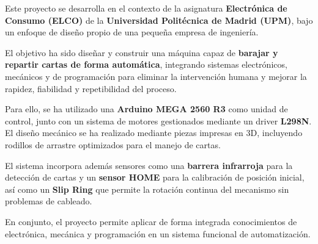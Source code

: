 Este proyecto se desarrolla en el contexto de la asignatura \textbf{Electrónica de Consumo (ELCO)} de la \textbf{Universidad Politécnica de Madrid (UPM)}, bajo un enfoque de diseño propio de una pequeña empresa de ingeniería.

El objetivo ha sido diseñar y construir una máquina capaz de \textbf{barajar y repartir cartas de forma automática}, integrando sistemas electrónicos, mecánicos y de programación para eliminar la intervención humana y mejorar la rapidez, fiabilidad y repetibilidad del proceso.

Para ello, se ha utilizado una \textbf{Arduino MEGA 2560 R3} como unidad de control, junto con un sistema de motores gestionados mediante un driver \textbf{L298N}. El diseño mecánico se ha realizado mediante piezas impresas en 3D, incluyendo rodillos de arrastre optimizados para el manejo de cartas.

El sistema incorpora además sensores como una \textbf{barrera infrarroja} para la detección de cartas y un \textbf{sensor HOME} para la calibración de posición inicial, así como un \textbf{Slip Ring} que permite la rotación continua del mecanismo sin problemas de cableado.

En conjunto, el proyecto permite aplicar de forma integrada conocimientos de electrónica, mecánica y programación en un sistema funcional de automatización.